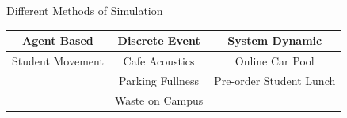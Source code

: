 \documentclass[18pt]{beamer}
\begin{document}
    \begin{frame}{Different Methods of Simulation}
        \begin{centering}
            \begin{tabular}{| c | c | c |}
                \hline
                Agent Based      & Discrete Event  & System Dynamic \\
                \hline
                \pause
                Student Movement & Cafe Acoustics    & Online Car Pool \\ \pause
                                 & Parking Fullness  & Pre-order Student Lunch \\ \pause
                                 & Waste on Campus   & \\

                \hline

            \end{tabular}
        \end{centering}
    \end{frame}
\end{document}
